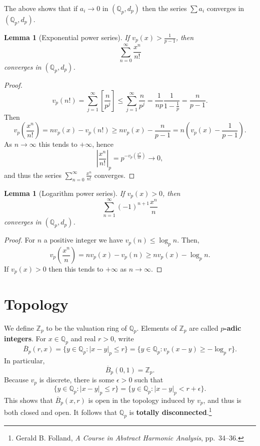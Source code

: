 \documentclass{article}
\theoremstyle{plain}
\newtheorem{lemma}[theorem]{Lemma}
\theoremstyle{definition}
\begin{document}
The above shows that if $a_i \to 0$ in $(\mathbb{Q}_p,d_p)$ then the series $\sum a_i$ converges in
$(\mathbb{Q}_p,d_p)$. 

\begin{lemma}[Exponential power series]
If $v_p(x)>\frac{1}{p-1}$, then
\[
\sum_{n=0}^\infty \frac{x^n}{n!}
\]
converges in $(\mathbb{Q}_p,d_p)$. 
\end{lemma}
\begin{proof}
\[
v_p(n!) = \sum_{j=1}^\infty \left[ \frac{n}{p^j} \right]
\leq \sum_{j=1}^\infty \frac{n}{p^j}
=\frac{1}{np} \frac{1}{1-\frac{1}{p}}
=\frac{n}{p-1}.
\]
Then
\[
v_p\left( \frac{x^n}{n!} \right) = n v_p(x) - v_p(n!) 
\geq n v_p(x) - \frac{n}{p-1}
=n\left(v_p(x)-\frac{1}{p-1}\right).
\]
As $n \to \infty$ this tends to $+\infty$, hence
\[
\left| \frac{x^n}{n!} \right|_p = p^{-v_p\left( \frac{x^n}{n!} \right)} \to 0,
\]
and thus the series $\sum_{n=0}^\infty \frac{x^n}{n!}$ converges. 
\end{proof}


\begin{lemma}[Logarithm power series]
If $v_p(x)>0$, then
\[
\sum_{n=1}^\infty (-1)^{n+1} \frac{x^n}{n}
\]
converges in $(\mathbb{Q}_p,d_p)$. 
\end{lemma}
\begin{proof}
For $n$ a positive integer we have $v_p(n) \leq \log_p n$. Then,
\[
v_p\left(\frac{x^n}{n}\right)=
nv_p(x)-v_p(n) \geq 
nv_p(x)-\log_p n.
\]
If $v_p(x)>0$ then this tends to $+\infty$ as $n \to \infty$.
\end{proof}



\section{Topology}
We define $\mathbb{Z}_p$ to be the valuation ring of $\mathbb{Q}_p$. Elements of $\mathbb{Z}_p$ are called
\textbf{$p$-adic integers}. 
For $x \in \mathbb{Q}_p$ and real $r>0$, write
\[
\overline{B}_p(r,x) = \{y \in \mathbb{Q}_p:|x-y|_p \leq r\}
=\{y \in \mathbb{Q}_p: v_p(x-y) \geq -\log_p r\}.
\]
In particular,
\[
\overline{B}_p(0,1) = \mathbb{Z}_p.
\]
Because $v_p$ is discrete, there is some $\epsilon>0$ such that
\[
\{y \in \mathbb{Q}_p: |x-y|_p \leq r\} = 
\{y \in \mathbb{Q}_p: |x-y|_p < r+\epsilon\}.
\]
This shows that $\overline{B}_p(x,r)$ is open in the topology induced by $v_p$, and thus is both closed and open. 
It follows that $\mathbb{Q}_p$ is \textbf{totally disconnected}.\footnote{Gerald B. Folland, {\em A Course in Abstract Harmonic Analysis}, pp.~34--36.}
\end{document}
